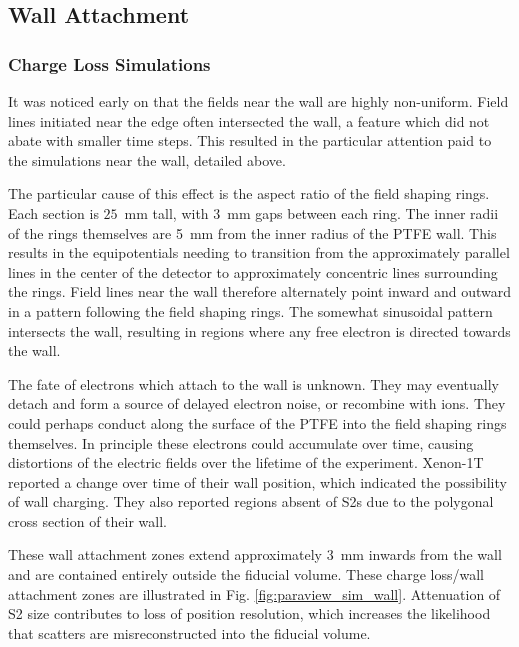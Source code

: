 \subsection{Wall Attachment}
\subsubsection{Charge Loss Simulations}
It was noticed early on that the fields near the wall are highly non-uniform.
Field lines initiated near the edge often intersected the wall, a feature which did not abate with smaller time steps.
This resulted in the particular attention paid to the simulations near the wall, detailed above.

The particular cause of this effect is the aspect ratio of the field shaping rings. 
Each section is $25$~mm tall, with $3$~mm gaps between each ring.
The inner radii of the rings themselves are 5~mm from the inner radius of the PTFE wall. 
This results in the equipotentials needing to transition from the approximately parallel lines in the center of the detector to approximately concentric lines surrounding the rings. 
Field lines near the wall therefore alternately point inward and outward in a pattern following the field shaping rings.
The somewhat sinusoidal pattern intersects the wall, resulting in regions where any free electron is directed towards the wall.

The fate of electrons which attach to the wall is unknown. 
They may eventually detach and form a source of delayed electron noise, or recombine with ions.
They could perhaps conduct along the surface of the PTFE into the field shaping rings themselves.
In principle these electrons could accumulate over time, causing distortions of the electric fields over the lifetime of the experiment.
Xenon-1T reported a change over time of their wall position, which indicated the possibility of wall charging.
They also reported regions absent of S2s due to the polygonal cross section of their wall.

These wall attachment zones extend approximately 3~mm inwards from the wall and are contained entirely outside the fiducial volume.
These charge loss/wall attachment zones are illustrated in Fig. \ref{fig:paraview_sim_wall}.
Attenuation of S2 size contributes to  loss of position resolution, which increases the likelihood that scatters are misreconstructed into the fiducial volume.


